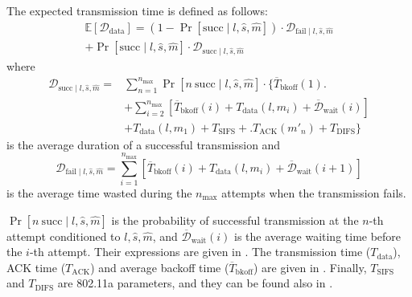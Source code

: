 \documentclass[twoside,nohyper]{tufte-book}
\theoremstyle{definition}
\theoremstyle{definition}
\theoremstyle{definition}
\theoremstyle{remark}
\begin{document}
The expected transmission time is defined as follows:
%
\begin{equation}
\begin{split}
 {\mathbb E}\left[ \mathcal{D}_\mathrm{data} \right] = \left(1 - \Pr[\mathrm{succ} \mid l, \hat{s}, \hat{m}]\right) \cdot \mathcal{D}_{\mathrm{fail} \mid l, \hat{s}, \hat{m}} \\
 + \Pr[\mathrm{succ} \mid l, \hat{s}, \hat{m}] \cdot \mathcal{D}_{\mathrm{succ} \mid l, \hat{s}, \hat{m}}
\end{split}
\label{eq:Ddata}
\end{equation}
%
where
%
\begin{equation}
\begin{split}
 \mathcal{D}_{\mathrm{succ} \mid l, \hat{s}, \hat{m}} = &\sum_{n=1}^{n_\mathrm{max}} \Pr[n \mathrm{~succ} \mid l, \hat{s}, \hat{m}] \cdot \biggl\lbrace \overline{T}_\mathrm{bkoff}(1) \biggr. \\
 &+ \sum_{i=2}^{n_\mathrm{max}} \left[\overline{T}_\mathrm{bkoff}(i)\right.+ \left.T_\mathrm{data}(l, m_i) + \overline{\mathcal{D}}_\mathrm{wait}(i)\right] \\
 &+ T_\mathrm{data}(l, m_1) + T_\mathrm{SIFS} + \biggl.T_\mathrm{ACK}(m'_n) + T_\mathrm{DIFS} \biggr\rbrace
\end{split}
\label{eq:Dsucc}
\end{equation}
%
is the average duration of a successful transmission and
%
\begin{equation}
 \mathcal{D}_{\mathrm{fail} \mid l, \hat{s}, \hat{m}} = \sum_{i=1}^{n_\mathrm{max}} \left[\overline{T}_\mathrm{bkoff}(i) + T_\mathrm{data}(l, m_i) + \overline{\mathcal{D}}_\mathrm{wait}(i+1)\right] 
\label{eq:Dfail}
\end{equation}
%
is the average time wasted during the \(n_\mathrm{max}\) attempts when
the transmission fails.

\(\Pr[n \mathrm{~succ} \mid l, \hat{s}, \hat{m}]\) is the probability of
successful transmission at the \(n\)-th attempt conditioned to
\(l, \hat{s}, \hat{m}\), and \(\overline{\mathcal{D}}_\mathrm{wait}(i)\)
is the average waiting time before the \(i\)-th attempt. Their
expressions are given in \citet[Equations (7)--(8)]{Qiao2002}. The
transmission time (\(T_\mathrm{data}\)), ACK time (\(T_\mathrm{ACK}\))
and average backoff time (\(\overline{T}_\mathrm{bkoff}\)) are given in
\citet[Equations (1)--(3)]{Qiao2002}. Finally, \(T_\mathrm{SIFS}\) and
\(T_\mathrm{DIFS}\) are 802.11a parameters, and they can be found also
in \citet[Table 2]{Qiao2002}.
\end{document}
